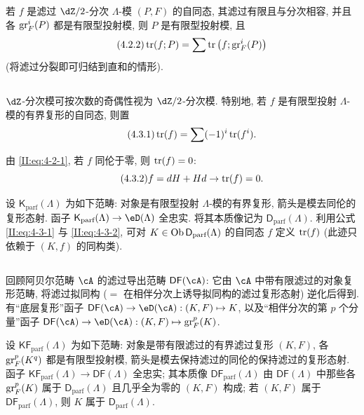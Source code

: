 若 $f$ 是滤过 $\dZ/2$-分次 $\Lambda$-模 $(P,F)$ 的自同态, 其滤过有限且与分次相容, 并且各 $\operatorname{gr}_F^i(P)$ 都是有限型投射模, 则 $P$ 是有限型投射模, 且
\begin{equation*}\tag{4.2.2}\label{II:eq:4-2-2}
  \operatorname{tr}(f;P) = \sum \operatorname{tr}\left(f; \operatorname{gr}_F^i(P) \right)
\end{equation*}
(将滤过分裂即可归结到直和的情形).

\subsection{}\label{II:4-3}

$\dZ$-分次模可按次数的奇偶性视为 $\dZ/2$-分次模. 特别地, 若 $f$ 是有限型投射 $\Lambda$-模的有界复形的自同态, 则置
\begin{equation*}\tag{4.3.1}\label{II:eq:4-3-1}
  \operatorname{tr}(f) = \sum (-1)^i \operatorname{tr}(f^i) \text{.}
\end{equation*}

由 \eqref{II:eq:4-2-1}, 若 $f$ 同伦于零, 则 $\operatorname{tr}(f) = 0$:
\begin{equation*}\tag{4.3.2}\label{II:eq:4-3-2}
  f = d H + H d \rightarrow \operatorname{tr}(f) = 0 \text{.}
\end{equation*}

设 $\mathsf{K}_\text{parf}(\Lambda)$ 为如下范畴: 对象是有限型投射 $\Lambda$-模的有界复形, 箭头是模去同伦的复形态射. 函子 $\mathsf{K}_\text{parf}(\Lambda)\to\eD(\Lambda)$ 全忠实. 将其本质像记为 $\mathsf{D}_\text{parf}(\Lambda)$. 利用公式 \eqref{II:eq:4-3-1} 与 \eqref{II:eq:4-3-2}, 可对 $K\in\operatorname{Ob} \mathsf{D}_\text{parf}(\Lambda)$ 的自同态 $f$ 定义 $\operatorname{tr}(f)$ (此迹只依赖于 $(K,f)$ 的同构类).

\subsection{}\label{II:4-4}

回顾阿贝尔范畴 $\cA$ 的滤过导出范畴 $\mathsf{DF}(\cA)$: 它由 $\cA$ 中带有限滤过的对象复形范畴, 将滤过拟同构 ($=$ 在相伴分次上诱导拟同构的滤过复形态射) 逆化后得到. 有“底层复形”函子 $\mathsf{DF}(\cA)\to\eD(\cA): (K,F)\mapsto K$, 以及“相伴分次的第 $p$ 个分量”函子 $\mathsf{DF}(\cA)\to\eD(\cA): (K,F)\mapsto \gr_F^p(K)$.

设 $\mathsf{KF}_\text{parf}(\Lambda)$ 为如下范畴: 对象是带有限滤过的有界滤过复形 $(K,F)$, 各 $\operatorname{gr}_F^p(K^q)$ 都是有限型投射模, 箭头是模去保持滤过的同伦的保持滤过的复形态射. 函子 $\mathsf{KF}_\text{parf}(\Lambda)\to\mathsf{DF}(\Lambda)$ 全忠实; 其本质像 $\mathsf{DF}_\text{parf}(\Lambda)$ 由 $\mathsf{DF}(\Lambda)$ 中那些各 $\operatorname{gr}_F^p(K)$ 属于 $\mathsf{D}_\text{parf}(\Lambda)$ 且几乎全为零的 $(K,F)$ 构成; 若 $(K,F)$ 属于 $\mathsf{DF}_\text{parf}(\Lambda)$, 则 $K$ 属于 $\mathsf{D}_\text{parf}(\Lambda)$.


